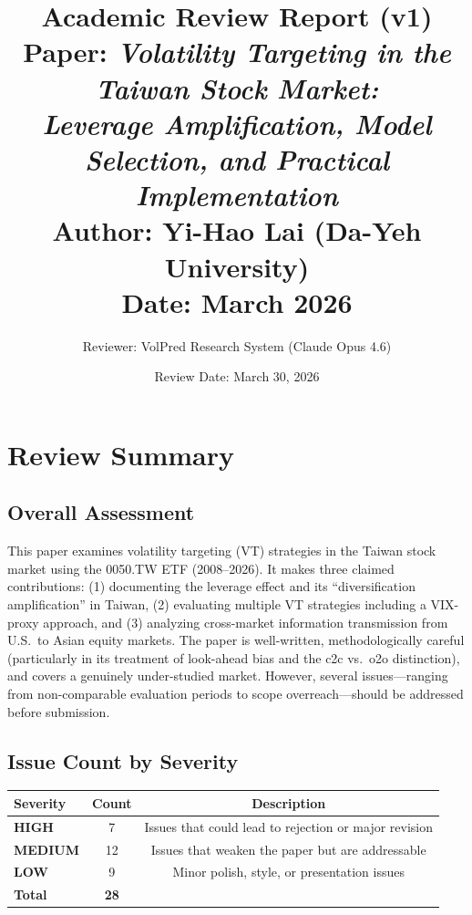 \documentclass[12pt,a4paper]{article}
\title{Academic Review Report (v1)\\[6pt]
\large Paper: \textit{Volatility Targeting in the Taiwan Stock Market:\\
Leverage Amplification, Model Selection, and Practical Implementation}\\[4pt]
\normalsize Author: Yi-Hao Lai (Da-Yeh University)\\
Date: March 2026}
\author{Reviewer: VolPred Research System (Claude Opus 4.6)}
\date{Review Date: March 30, 2026}
\begin{document}
\maketitle

\tableofcontents
\newpage

\section{Review Summary}

\subsection{Overall Assessment}

This paper examines volatility targeting (VT) strategies in the Taiwan stock market using the 0050.TW ETF (2008--2026). It makes three claimed contributions: (1) documenting the leverage effect and its ``diversification amplification'' in Taiwan, (2) evaluating multiple VT strategies including a VIX-proxy approach, and (3) analyzing cross-market information transmission from U.S.\ to Asian equity markets. The paper is well-written, methodologically careful (particularly in its treatment of look-ahead bias and the c2c vs.\ o2o distinction), and covers a genuinely under-studied market. However, several issues---ranging from non-comparable evaluation periods to scope overreach---should be addressed before submission.

\subsection{Issue Count by Severity}

\begin{center}
\begin{tabular}{lcc}
\toprule
Severity & Count & Description \\
\midrule
\textcolor{errorred}{\textbf{HIGH}} & 7 & Issues that could lead to rejection or major revision \\
\textcolor{warncolor}{\textbf{MEDIUM}} & 12 & Issues that weaken the paper but are addressable \\
\textcolor{infocolor}{\textbf{LOW}} & 9 & Minor polish, style, or presentation issues \\
\midrule
\textbf{Total} & \textbf{28} & \\
\bottomrule
\end{tabular}
\end{center}
\end{document}
